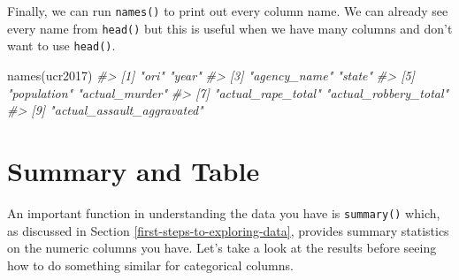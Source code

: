 \documentclass[
]{krantz}
\makeatletter
\newenvironment{Shaded}{\begin{snugshade}}{\end{snugshade}}
\newcommand{\CommentTok}[1]{\textcolor[rgb]{0.37,0.37,0.37}{\textit{#1}}}
\newcommand{\FunctionTok}[1]{\textcolor[rgb]{0,0,0}{#1}}
\newcommand{\NormalTok}[1]{#1}
\newenvironment{kframe}{%
\medskip{}
\setlength{\fboxsep}{.8em}
 \def\at@end@of@kframe{}%
 \ifinner\ifhmode%
  \def\at@end@of@kframe{\end{minipage}}%
  \begin{minipage}{\columnwidth}%
 \fi\fi%
 \def\FrameCommand##1{\hskip\@totalleftmargin \hskip-\fboxsep
 \colorbox{shadecolor}{##1}\hskip-\fboxsep
     \hskip-\linewidth \hskip-\@totalleftmargin \hskip\columnwidth}%
 \MakeFramed {\advance\hsize-\width
   \@totalleftmargin\z@ \linewidth\hsize
   \@setminipage}}%
 {\par\unskip\endMakeFramed%
 \at@end@of@kframe}
\renewenvironment{Shaded}{\begin{kframe}}{\end{kframe}}
\makeatother
\begin{document}
Finally, we can run \texttt{names()} to print out every
column name. We can already see every name from
\texttt{head()} but this is useful when we have many columns
and don't want to use \texttt{head()}.

\begin{Shaded}
\begin{Highlighting}[]
\FunctionTok{names}\NormalTok{(ucr2017)}
\CommentTok{\#\textgreater{} [1] "ori"                       "year"                     }
\CommentTok{\#\textgreater{} [3] "agency\_name"               "state"                    }
\CommentTok{\#\textgreater{} [5] "population"                "actual\_murder"            }
\CommentTok{\#\textgreater{} [7] "actual\_rape\_total"         "actual\_robbery\_total"     }
\CommentTok{\#\textgreater{} [9] "actual\_assault\_aggravated"}
\end{Highlighting}
\end{Shaded}

\hypertarget{summary-and-table}{%
\section{Summary and Table}\label{summary-and-table}}

An important function in understanding the data you have is
\texttt{summary()} which, as discussed in Section
\ref{first-steps-to-exploring-data}, provides summary
statistics on the numeric columns you have. Let's take a
look at the results before seeing how to do something
similar for categorical columns.
\end{document}
